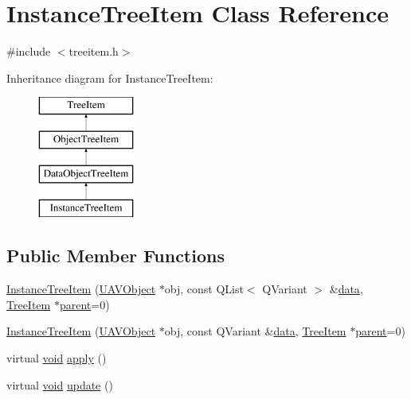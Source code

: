 \hypertarget{class_instance_tree_item}{\section{\-Instance\-Tree\-Item \-Class \-Reference}
\label{class_instance_tree_item}
}


{\ttfamily \#include $<$treeitem.\-h$>$}

\-Inheritance diagram for \-Instance\-Tree\-Item\-:\begin{figure}[H]
\begin{center}
\leavevmode
\includegraphics[height=4.000000cm]{class_instance_tree_item}
\end{center}
\end{figure}
\subsection*{\-Public \-Member \-Functions}
\begin{DoxyCompactItemize}
\item 
\hyperlink{group___u_a_v_object_browser_plugin_gabd66635c3e24281e23eada197638556f}{\-Instance\-Tree\-Item} (\hyperlink{class_u_a_v_object}{\-U\-A\-V\-Object} $\ast$obj, const \-Q\-List$<$ \-Q\-Variant $>$ \&\hyperlink{group___u_a_v_object_browser_plugin_ga7c5708ae3cbba9c509f497c493beccb6}{data}, \hyperlink{class_tree_item}{\-Tree\-Item} $\ast$\hyperlink{group___u_a_v_object_browser_plugin_gaa3a7ba624312b6be70872634db291881}{parent}=0)
\item 
\hyperlink{group___u_a_v_object_browser_plugin_ga1bcb15718988cc4a3a33c7ff85c7c00d}{\-Instance\-Tree\-Item} (\hyperlink{class_u_a_v_object}{\-U\-A\-V\-Object} $\ast$obj, const \-Q\-Variant \&\hyperlink{group___u_a_v_object_browser_plugin_ga7c5708ae3cbba9c509f497c493beccb6}{data}, \hyperlink{class_tree_item}{\-Tree\-Item} $\ast$\hyperlink{group___u_a_v_object_browser_plugin_gaa3a7ba624312b6be70872634db291881}{parent}=0)
\item 
virtual \hyperlink{group___u_a_v_objects_plugin_ga444cf2ff3f0ecbe028adce838d373f5c}{void} \hyperlink{group___u_a_v_object_browser_plugin_gafd9da1af77e6f69ebd81764de23cc4c0}{apply} ()
\item 
virtual \hyperlink{group___u_a_v_objects_plugin_ga444cf2ff3f0ecbe028adce838d373f5c}{void} \hyperlink{group___u_a_v_object_browser_plugin_ga2f98ddf82fa4ee89c654de207ba2f551}{update} ()
\end{DoxyCompactItemize}


